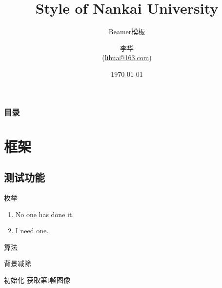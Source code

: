 \documentclass[UTF8]{beamer}
\title[Beamer模板]{Style of Nankai University}
\subtitle{Beamer模板}
\author[李华]{李华\\(\url{lihua@163.com})}
\institute{南开大学XX学院}
\date{\today}
\begin{document}

\renewcommand{\contentsname}{目录}     %
\renewcommand{\abstractname}{摘要}     %
\renewcommand{\refname}{参考文献}      %
\renewcommand{\indexname}{索引}
\renewcommand{\figurename}{图}
\renewcommand{\tablename}{表}
\renewcommand{\appendixname}{附录}
\begin{frame}[plain]
\maketitle
\end{frame}


\begin{frame}
\frametitle{目录}
\tableofcontents
\end{frame}
\section{框架}

\subsection{测试功能}

\begin{frame}{枚举}
    \begin{enumerate}
        \item No one has done it.
        \item I need one.
    \end{enumerate}
\end{frame}

\begin{frame}{算法}
    \begin{algorithm}[H]
        \caption{背景减除}
        \begin{algorithmic}[1]
            \STATE 初始化
            \REPEAT
            \STATE 获取第t帧图像
        \end{algorithmic}
    \end{algorithm}
\end{frame}
\end{document}
